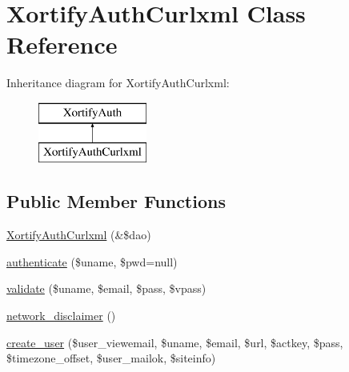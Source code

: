 \hypertarget{class_xortify_auth_curlxml}{\section{Xortify\-Auth\-Curlxml Class Reference}
\label{class_xortify_auth_curlxml}
}
Inheritance diagram for Xortify\-Auth\-Curlxml\-:\begin{figure}[H]
\begin{center}
\leavevmode
\includegraphics[height=2.000000cm]{class_xortify_auth_curlxml}
\end{center}
\end{figure}
\subsection*{Public Member Functions}
\begin{DoxyCompactItemize}
\item 
\hyperlink{class_xortify_auth_curlxml_a844bfdd5dd71d8f66825da30daf0fb41}{Xortify\-Auth\-Curlxml} (\&\$dao)
\item 
\hyperlink{class_xortify_auth_curlxml_a127808450eda5019e55c531c62a2477e}{authenticate} (\$uname, \$pwd=null)
\item 
\hyperlink{class_xortify_auth_curlxml_a2940e97c01e60712411b88170dd0e7e1}{validate} (\$uname, \$email, \$pass, \$vpass)
\item 
\hyperlink{class_xortify_auth_curlxml_a68af0972e6bc6473b6ccd63e558e32ab}{network\-\_\-disclaimer} ()
\item 
\hyperlink{class_xortify_auth_curlxml_af7e2db52b0b66f9cde31521c439b64ad}{create\-\_\-user} (\$user\-\_\-viewemail, \$uname, \$email, \$url, \$actkey, \$pass, \$timezone\-\_\-offset, \$user\-\_\-mailok, \$siteinfo)
\end{DoxyCompactItemize}
